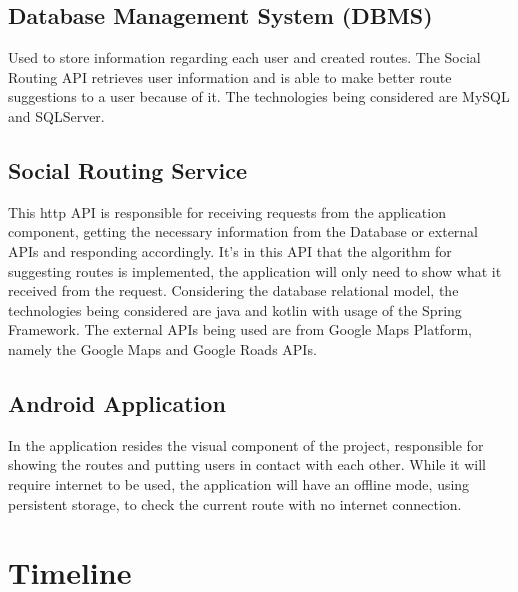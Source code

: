 \documentclass{article}
\begin{document}
        \subsection{Database Management System (DBMS)}  
            Used to store information regarding each user and created routes. The Social Routing API retrieves user information and is able
            to make better route suggestions to a user because of it. The technologies being considered are MySQL and SQLServer.    

        \subsection{Social Routing Service}
            This http API is responsible for receiving requests from the application component, getting the necessary information from the Database or external APIs
            and responding accordingly. It's in this API that the algorithm for suggesting routes is implemented, the application will only need to show what it
            received from the request.
            Considering the database relational model, the technologies being considered are java and kotlin with usage of the Spring Framework. 
            The external APIs being used are from Google Maps Platform, namely the Google Maps and Google Roads APIs.  

        \subsection{Android Application}
            In the application resides the visual component of the project, responsible for showing the routes and putting users in contact with each other.
            While it will require internet to be used, the application will have an offline mode, using persistent storage, to check the current route with no internet connection.

    \section{Timeline}   
\end{document}
